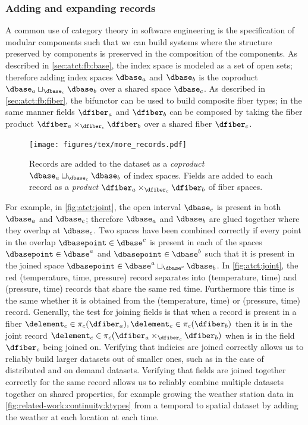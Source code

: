 \documentclass[review]{vgtc}
\theoremstyle{definition}
\theoremstyle{remark}
\begin{document}
\subsubsection{Adding and expanding records}

A common use of category theory in software engineering is the specification of modular components \cite{wielsManagementEvolvingSpecifications1998} such that we can build systems where the structure preserved by components is preserved in the composition of the components. As described in \autoref{sec:atct:fb:base}, the index space is modeled as a set of open sets; therefore adding index spaces $\dbase_a$ and $\dbase_b$ is the coproduct $\dbase_{a} \sqcup_{\dbase_{c}} \dbase_{b}$ over a shared space $\dbase_{c}$. As described in \autoref{sec:atct:fb:fiber}, the bifunctor can be used to build composite fiber types;  in the same manner fields $\dfiber_a$ and $\dfiber_b$ can be composed by taking the fiber product $\dfiber_{a}\times_{\dfiber_{c}} \dfiber_b$ over a shared fiber $\dfiber_c$.


\begin{figure}[H]
  \texttt{[image: figures/tex/more\_records.pdf]}
  \caption{Records are added to the dataset as a \textit{coproduct} $\dbase_{a}\sqcup_{\dbase_c} \dbase_{b}$ of index spaces. Fields are added to each record as a \textit{product} $\dfiber_{a}\times_{\dfiber_c} \dfiber_{b}$ of fiber spaces.}
  \label{fig:atct:joint}
\end{figure}

For example, in \autoref{fig:atct:joint}, the open interval $\dbase_c$ is present in both $\dbase_a$ and $\dbase_c$; therefore $\dbase_a$ and $\dbase_b$ are glued together where they overlap at $\dbase_c$.  Two spaces have been combined correctly if every point in the overlap  $\dbasepoint \in \dbase^{c}$ is present in each of the spaces $\dbasepoint \in \dbase^{a}$ and $\dbasepoint \in \dbase^{b}$ such that it is present in the joined space $\dbasepoint \in \dbase^{a}\sqcup_{\dbase^{c}} \dbase_{b}$. In \autoref{fig:atct:joint}, the red (temperature, time, pressure) record separates into (temperature, time) and (pressure, time) records that share the same red time. Furthermore this time is the same whether it is obtained from the (temperature, time) or (pressure, time) record. Generally, the test for joining fields is that when a record is present in a fiber $\delement_{c} \in \pi_c(\dfiber_{a}), \delement_c \in \pi_c(\dfiber_{b})$ then it is in the joint record $\delement_{c} \in \pi_c(\dfiber_{a}\times_{\dfiber_c}\dfiber_{b})$ when is in the field $\dfiber_c$ being joined on. Verifying that indicies are joined correctly allows us to reliably build larger datasets out of smaller ones, such as in the case of distributed and on demand datasets. Verifying that fields are joined together correctly for the same record allows us to reliably combine multiple datasets together on shared properties, for example growing the weather station data in \autoref{fig:related-work:continuity:ktypes} from a temporal to spatial dataset by adding the weather at each location at each time.
\end{document}
